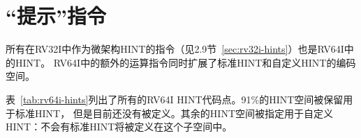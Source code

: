 \section{“提示”指令}
\label{sec:rv64i-hints}

所有在RV32I中作为微架构HINT的指令（见2.9节~\ref{sec:rv32i-hints}）也是RV64I中的HINT。
RV64I中的额外的运算指令同时扩展了标准HINT和自定义HINT的编码空间。

表~\ref{tab:rv64i-hints}列出了所有的RV64I HINT代码点。91\%的HINT空间被保留用于标准HINT，
但是目前还没有被定义。其余的HINT空间被指定用于自定义HINT：不会有标准HINT将被定义在这个子空间中。

